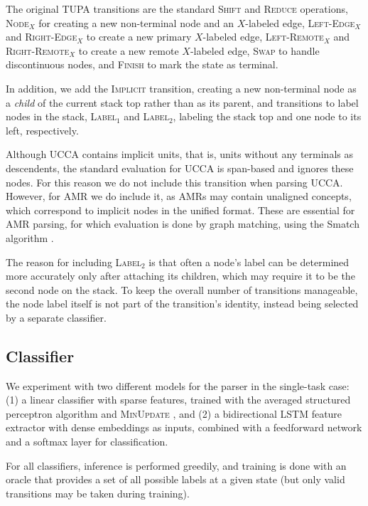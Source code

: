 \documentclass[11pt,a4paper]{article}
\begin{document}
The original TUPA transitions are
the standard \textsc{Shift} and \textsc{Reduce} operations,
\textsc{Node$_X$} for creating a new non-terminal node and an $X$-labeled edge,
\textsc{Left-Edge$_X$} and \textsc{Right-Edge$_X$} to create a new primary $X$-labeled edge,
\textsc{Left-Remote$_X$} and \textsc{Right-Remote$_X$} to create a new remote $X$-labeled edge,
\textsc{Swap} to handle discontinuous nodes,
and \textsc{Finish} to mark the state as terminal.

In addition, we add the \textsc{Implicit} transition, creating a new non-terminal
node as a \textit{child} of the current stack top rather than as its parent,
and transitions to
label nodes in the stack, \textsc{Label$_1$} and \textsc{Label$_2$},
labeling the stack top and one node to its left, respectively.

Although UCCA contains implicit units, that is, units without
any terminals as descendents,
the standard evaluation for UCCA \cite{abend2013universal} is span-based and
ignores these nodes.
For this reason we do not include this transition when parsing UCCA.
However, for AMR we do include it, as AMRs may contain unaligned concepts,
which correspond to implicit nodes in the unified format.
These are essential for AMR parsing, for which evaluation is done
by graph matching, using the Smatch algorithm \cite{cai2013smatch}.

The reason for including \textsc{Label$_2$} is that often a node's
label can be determined more accurately only after attaching its children,
which may require it to be the second node on the stack.
To keep the overall number of transitions manageable,
the node label itself is not part of the transition's identity,
instead being selected by a separate classifier.

\subsection{Classifier}\label{sec:classifier}
We experiment with two different models for the parser in the single-task case:
(1) a linear classifier with sparse features, trained with the averaged structured perceptron algorithm
\cite{Coll:04} and \textsc{MinUpdate} \cite{goldberg2011learning},
and (2) a bidirectional LSTM feature extractor with dense embeddings as inputs,
combined with a feedforward network and a softmax layer for classification.

For all classifiers, inference is performed greedily,
and training is done with an oracle that provides a set of all possible labels at a given state
(but only valid transitions may be taken during training).
\end{document}
